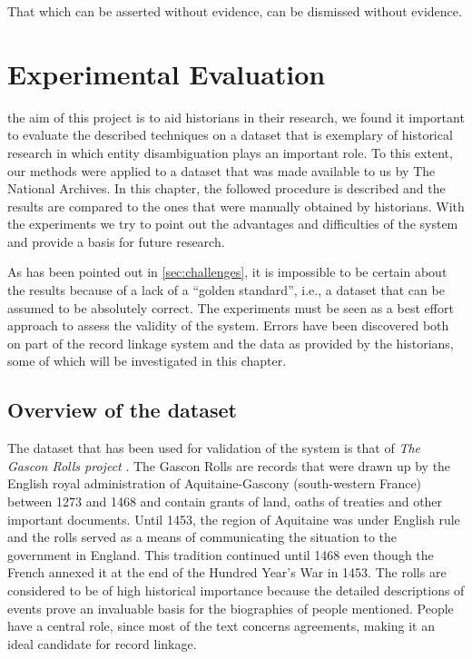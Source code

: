 \begin{savequote}[75mm] 
That which can be asserted without evidence, can be dismissed without evidence.
\end{savequote}




\chapter{Experimental Evaluation}
\label{ch:experiments}

 the aim of this project is to aid historians in their research, we found it important to evaluate the described techniques on a dataset that is exemplary of historical research in which entity disambiguation plays an important role.
To this extent, our methods were applied to a dataset that was made available to us by The National Archives.
In this chapter, the followed procedure is described and the results are compared to the ones that were manually obtained by historians.
With the experiments we try to point out the advantages and difficulties of the system and provide a basis for future research.

As has been pointed out in \cref{sec:challenges}, it is impossible to be certain about the results because of a lack of a ``golden standard'', i.e., a dataset that can be assumed to be absolutely correct.
The experiments must be seen as a best effort approach to assess the validity of the system.
Errors have been discovered both on part of the record linkage system and the data as provided by the historians, some of which will be investigated in this chapter.




\section{Overview of the dataset}
\label{sec:dataset}

The dataset that has been used for validation of the system is that of \emph{The Gascon Rolls project} \citep{GasconRolls}.
The Gascon Rolls are records that were drawn up by the English royal administration of Aquitaine-Gascony (south-western France) between 1273 and 1468 and contain grants of land, oaths of treaties and other important documents.
Until 1453, the region of Aquitaine was under English rule and the rolls served as a means of communicating the situation to the government in England.
This tradition continued until 1468 even though the French annexed it at the end of the Hundred Year's War in 1453.
The rolls are considered to be of high historical importance because the detailed
descriptions of events prove an invaluable basis for the biographies of people mentioned.
People have a central role, since most of the text concerns agreements, making it an ideal candidate for record linkage.

